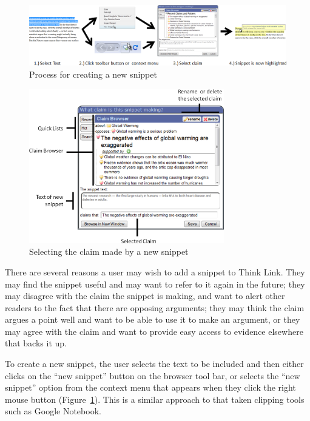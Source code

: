 \documentclass{chi2009}
\begin{document}
\begin{figure}[tb]
	\begin{center}
	\includegraphics[width=16cm]{../screenshots/newsnip_all.png}
	\caption{Process for creating a new snippet}
	\label{createprocess}
	\end{center}
\end{figure}


\begin{figure}[tb]
	\includegraphics[width=8.5cm]{../screenshots/snipsave_diagram_full.png}
	\caption{Selecting the claim made by a new snippet}
	\label{snipsavecrop}
\end{figure}

There are several reasons a user may wish to add a snippet to Think Link. They may find the snippet useful and may want to refer to it again in the future; they may disagree with the claim the snippet is making, and want to alert other readers to the fact that there are opposing arguments; they may think the claim argues a point well and want to be able to use it to make an argument, or they may agree with the claim and want to provide easy access to evidence elsewhere that backs it up. 

To create a new snippet, the user selects the text to be included and then either clicks on the ``new snippet'' button on the browser tool bar, or selects the ``new snippet'' option from the context menu that appears when they click the right mouse button (Figure~\ref{createprocess}). This is a similar approach to that taken clipping tools such as Google Notebook.
\end{document}
